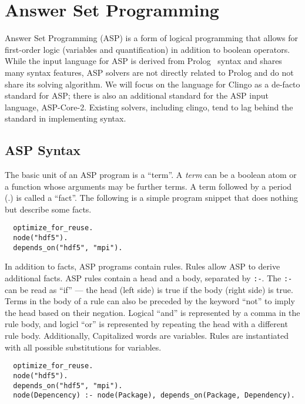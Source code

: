 \section{Answer Set Programming}
\label{sec:asp}

Answer Set Programming (ASP) is a form of logical programming that allows for first-order logic (variables and quantification) in addition to boolean operators.
While the input language for ASP is derived from Prolog~\cite{prolog} syntax and shares many syntax features, ASP solvers are not directly related to Prolog and do not share its solving algorithm.
We will focus on the language for Clingo as a de-facto standard for ASP; there is also an additional standard for the ASP input language, ASP-Core-2.
Existing solvers, including clingo, tend to lag behind the standard in implementing syntax.

\subsection{ASP Syntax}

The basic unit of an ASP program is a ``term''.
A \textit{term} can be a boolean atom or a function whose arguments may be further terms.
A term followed by a period (.) is called a ``fact''.
The following is a simple program snippet that does nothing but describe some facts.

\begin{verbatim}
  optimize_for_reuse.
  node("hdf5").
  depends_on("hdf5", "mpi").
\end{verbatim}

In addition to facts, ASP programs contain rules.
Rules allow ASP to derive additional facts.
ASP rules contain a head and a body, separated by \texttt{:-}.
The \texttt{:-} can be read as ``if'' --- the head (left side) is true if the body (right side) is true.
Terms in the body of a rule can also be preceded by the keyword ``not'' to imply the head based on their negation.
Logical ``and'' is represented by a comma in the rule body, and logicl ``or'' is represented by repeating the head with a different rule body.
Additionally, Capitalized words are variables.
Rules are instantiated with all possible substitutions for variables.

\begin{verbatim}
  optimize_for_reuse.
  node("hdf5").
  depends_on("hdf5", "mpi").
  node(Depencency) :- node(Package), depends_on(Package, Dependency).
\end{verbatim}

